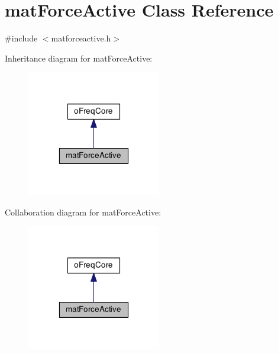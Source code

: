 \hypertarget{classmat_force_active}{\section{mat\-Force\-Active Class Reference}
\label{classmat_force_active}
}


{\ttfamily \#include $<$matforceactive.\-h$>$}



Inheritance diagram for mat\-Force\-Active\-:\nopagebreak
\begin{figure}[H]
\begin{center}
\leavevmode
\includegraphics[width=166pt]{classmat_force_active__inherit__graph}
\end{center}
\end{figure}


Collaboration diagram for mat\-Force\-Active\-:\nopagebreak
\begin{figure}[H]
\begin{center}
\leavevmode
\includegraphics[width=166pt]{classmat_force_active__coll__graph}
\end{center}
\end{figure}
